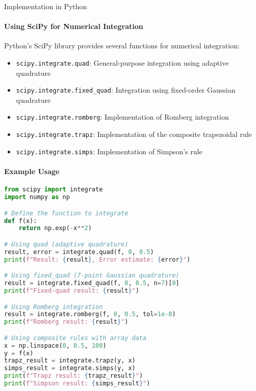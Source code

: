 \begin{KR}{Implementation in Python}\\
\paragraph{Using SciPy for Numerical Integration}
Python's SciPy library provides several functions for numerical integration:

\begin{itemize}
    \item \texttt{scipy.integrate.quad}: General-purpose integration using adaptive quadrature
    \item \texttt{scipy.integrate.fixed\_quad}: Integration using fixed-order Gaussian quadrature
    \item \texttt{scipy.integrate.romberg}: Implementation of Romberg integration
    \item \texttt{scipy.integrate.trapz}: Implementation of the composite trapezoidal rule
    \item \texttt{scipy.integrate.simps}: Implementation of Simpson's rule
\end{itemize}

\paragraph{Example Usage}
\begin{lstlisting}[language=Python, style=basesmol]
from scipy import integrate
import numpy as np

# Define the function to integrate
def f(x):
    return np.exp(-x**2)

# Using quad (adaptive quadrature)
result, error = integrate.quad(f, 0, 0.5)
print(f"Result: {result}, Error estimate: {error}")

# Using fixed_quad (7-point Gaussian quadrature)
result = integrate.fixed_quad(f, 0, 0.5, n=7)[0]
print(f"Fixed-quad result: {result}")

# Using Romberg integration
result = integrate.romberg(f, 0, 0.5, tol=1e-8)
print(f"Romberg result: {result}")

# Using composite rules with array data
x = np.linspace(0, 0.5, 100)
y = f(x)
trapz_result = integrate.trapz(y, x)
simps_result = integrate.simps(y, x)
print(f"Trapz result: {trapz_result}")
print(f"Simpson result: {simps_result}")
\end{lstlisting}
\end{KR}